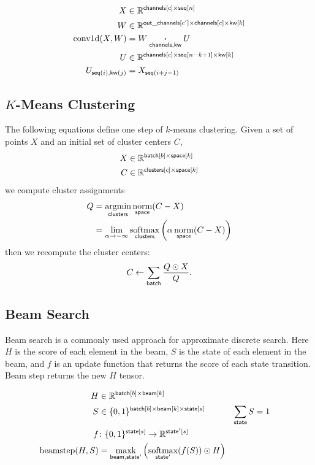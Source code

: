 \documentclass{article}
\newcommand{\reals}{\mathbb{R}}
\begin{document}
\begin{align*} 
X &\in \reals^{{\nset{channels}{c} \times \nset{seq}{n}}}  \\
W &\in \reals^{{\nset{out\_channels}{c'} \times \nset{channels}{c} \times \nset{kw}{k}}}  \\
\text{conv1d}(X, W) &= W \ndot{channels, kw} U \\
U &\in \reals^{{\nset{channels}{c} \times \nset{seq}{n-k +1} \times \nset{kw}{k}}}  \\
U_{\nidx{seq}{i}, \nidx{kw}{j}} & = X_{\nidx{seq}{i+j - 1}}  
\end{align*} 


\subsection{$K$-Means Clustering}

The following equations define one step of $k$-means clustering. Given a set of points $X$ and an initial set of cluster centers $C$,
\begin{align*} 
X &\in \reals^{\nset{batch}{b} \times \nset{space}{k}} \\
C &\in \reals^{\nset{clusters}{c} \times \nset{space}{k}}
\end{align*}
we compute cluster assignments
\begin{align*}
Q &= \nfun{clusters}{argmin} \nfun{space}{norm}(C-X) \\
  &= \lim_{\alpha \rightarrow -\infty} \nfun{clusters}{softmax} \left(\alpha \nfun{space}{norm}(C-X)\right)
\end{align*}
then we recompute the cluster centers:
\begin{equation*}
C \leftarrow \nsum{batch} \frac{Q \odot X}{Q}.
\end{equation*}

\subsection{Beam Search}

Beam search is a commonly used approach for approximate discrete search. Here $H$ is the score of each element in the beam, $S$ is the state of each element in the beam, and $f$ is an update function that returns the score of each state transition. 
Beam step returns the new $H$ tensor. 

\begin{align*} 
H &\in \reals^{{\nset{batch}{b} \times \nset{beam}{k}}} \\
S &\in \{0, 1\}^{{\nset{batch}{b} \times \nset{beam}{k} \times \nset{state}{s}}} & \nsum{state} S &= 1\\
f &\colon \{0, 1\}^{{\nset{state}{s}}} \rightarrow \reals^{{\nset{state'}{s}}} \\ 
\text{beamstep}(H, S) &= \nfun{beam, state'}{maxk} \left( \nfun{state'}{softmax}(f(S)) \odot H \right)
\end{align*} 
\end{document}
